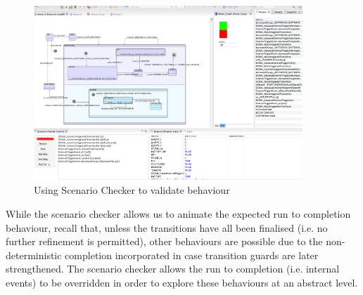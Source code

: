 \begin{figure}[!h]
	\centering
	\includegraphics[width=0.90\textwidth, trim=30 50 60 0]{figures/scenarioChecker.png}
	\caption{Using Scenario Checker to validate behaviour}
	\label{fig:scenarioChecker}
\end{figure}

While the scenario checker allows us to animate the expected run to completion behaviour, recall that, unless the transitions have all been finalised (i.e. no further refinement is permitted),  other behaviours are possible due to the non-deterministic completion incorporated in case transition guards are later strengthened. 
The scenario checker allows the run to completion (i.e. internal events) to be overridden in order to explore these behaviours at an abstract level.
 

